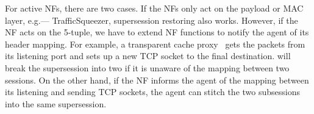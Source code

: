 For active NFs, there are two cases. If the NFs only act on the payload or MAC layer, e.g.--- TrafficSqueezer, supersession restoring also works. 
However, if the NF acts on the 5-tuple, we have to extend NF functions to notify the \system agent of its header mapping. 
For example, a transparent cache proxy~\cite{squid} gets the packets from its listening port and sets up a new TCP socket to the final destination. \system will break the supersession into two if it is unaware of the mapping between two sessions. On the other hand, if the NF informs the \system agent of the mapping between its listening and sending TCP sockets, the \system agent can stitch the two subsessions into the same supersession. 
 







% 
